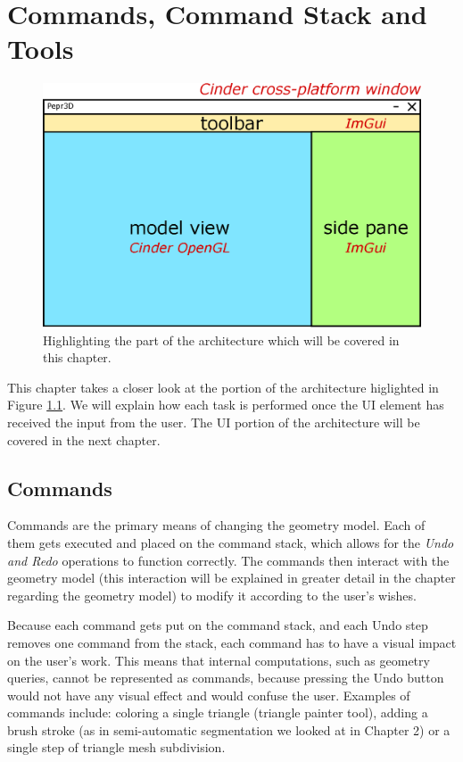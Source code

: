 \chapter{Commands, Command Stack and Tools}

\begin{figure}
	\centering
	\includegraphics[scale=0.5]{images/uioverview}
	\caption{Highlighting the part of the architecture which will be covered in this chapter.}
	\label{fig:arch}
\end{figure}

This chapter takes a closer look at the portion of the architecture higlighted in Figure \ref{fig:arch}. We will explain how each task is performed once the UI element has received the input from the user. The UI portion of the architecture will be covered in the next chapter.


\section{Commands}
Commands are the primary means of changing the geometry model. Each of them gets executed and placed on the command stack, which allows for the \textit{Undo and Redo} operations to function correctly. The commands then interact with the geometry model (this interaction will be explained in greater detail in the chapter regarding the geometry model) to modify it according to the user's wishes.

Because each command gets put on the command stack, and each Undo step removes one command from the stack, each command has to have a visual impact on the user's work. This means that internal computations, such as geometry queries, cannot be represented as commands, because pressing the Undo button would not have any visual effect and would confuse the user. Examples of commands include: coloring a single triangle (triangle painter tool), adding a brush stroke (as in semi-automatic segmentation we looked at in Chapter 2) or a single step of triangle mesh subdivision.

